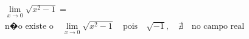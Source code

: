 \begin{ex}
\begin{align}
&\lim_{x\rightarrow 0} \sqrt{x^2-1}=\nonumber\\
&\text{n�o existe o}\quad\lim_{x\rightarrow 0} \sqrt{x^2-1}\quad\text{pois}\quad\sqrt{-1},\quad\nexists\quad\text{no campo real}\nonumber
\end{align}
\end{ex}